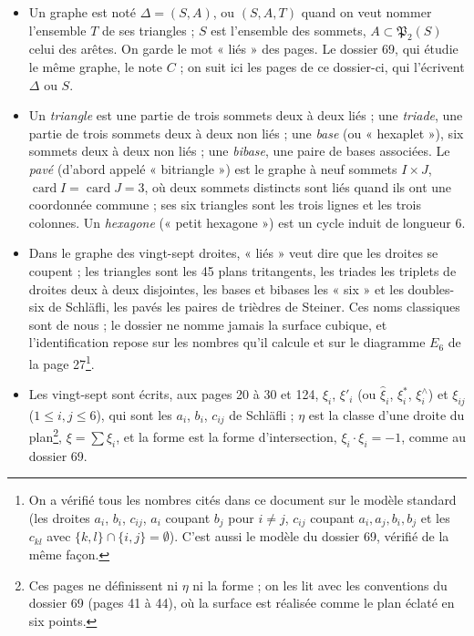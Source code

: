 \documentclass[11pt,a4paper]{article}
\begin{document}
\begin{itemize}
\item Un graphe est noté $\Delta = (S, A)$, ou $(S, A, T)$ quand on veut
  nommer l'ensemble $T$ de ses triangles ; $S$ est l'ensemble des sommets,
  $A \subset \mathfrak{P}_2(S)$ celui des arêtes. On garde le mot « liés » des
  pages. Le dossier 69, qui étudie le même graphe, le note $C$ ; on suit ici
  les pages de ce dossier-ci, qui l'écrivent $\Delta$ ou $S$.
\item Un \emph{triangle} est une partie de trois sommets deux à deux liés ;
  une \emph{triade}, une partie de trois sommets deux à deux non liés ; une
  \emph{base} (ou « hexaplet »), six sommets deux à deux non liés ; une
  \emph{bibase}, une paire de bases associées. Le \emph{pavé} (d'abord appelé
  « bitriangle ») est le graphe à neuf sommets $I \times J$, $\operatorname{card} I
  = \operatorname{card} J = 3$, où deux sommets distincts sont liés quand ils ont
  une coordonnée commune ; ses six triangles sont les trois lignes et les trois
  colonnes. Un \emph{hexagone} (« petit hexagone ») est un cycle induit de
  longueur 6.
\item Dans le graphe des vingt-sept droites, « liés » veut dire que les droites
  se coupent ; les triangles sont les 45 plans tritangents, les triades les
  triplets de droites deux à deux disjointes, les bases et bibases les « six »
  et les doubles-six de Schläfli, les pavés les paires de trièdres de Steiner.
  Ces noms classiques sont de nous ; le dossier ne nomme jamais la surface
  cubique, et l'identification repose sur les nombres qu'il calcule et sur le
  diagramme $E_6$ de la page 27\footnote{On a vérifié tous les nombres cités
  dans ce document sur le modèle standard (les droites $a_i$, $b_i$, $c_{ij}$,
  $a_i$ coupant $b_j$ pour $i \neq j$, $c_{ij}$ coupant $a_i, a_j, b_i, b_j$ et
  les $c_{kl}$ avec $\lbrace k, l\rbrace \cap \lbrace i, j\rbrace = \emptyset$).
  C'est aussi le modèle du dossier 69, vérifié de la même façon.}.
\item Les vingt-sept sont écrits, aux pages 20 à 30 et 124, $\xi_i$,
  $\xi'_i$ (ou $\hat\xi_i$, $\xi_i^*$, $\xi_i^\wedge$) et $\xi_{ij}$ ($1 \leq
  i, j \leq 6$), qui sont les $a_i$, $b_i$, $c_{ij}$ de Schläfli ; $\eta$ est
  la classe d'une droite du plan\footnote{Ces pages ne définissent ni $\eta$
  ni la forme ; on les lit avec les conventions du dossier 69 (pages 41 à
  44), où la surface est réalisée comme le plan éclaté en six points.}, $\xi = \sum \xi_i$, et la forme est la forme
  d'intersection, $\xi_i \cdot \xi_i = -1$, comme au dossier 69.

\end{itemize}
\end{document}
